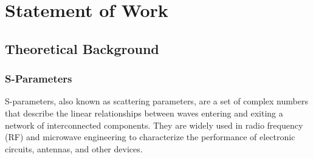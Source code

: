\documentclass[]{extarticle}
\begin{document}

\newpage
\section{Statement of Work}

\subsection{Theoretical Background}

\subsubsection{S-Parameters}


S-parameters, also known as scattering parameters, are a set of complex numbers that describe the linear relationships between waves entering and exiting a network of interconnected components. They are widely used in radio frequency (RF) and microwave engineering to characterize the performance of electronic circuits, antennas, and other devices.~\cite{Pozar:882338} \\
\end{document}
